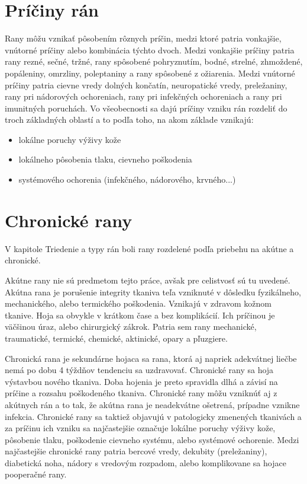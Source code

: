 \section{Príčiny rán}
Rany môžu vznikať pôsobením rôznych príčin, medzi ktoré patria vonkajšie, vnútorné príčiny alebo kombinácia týchto dvoch. Medzi vonkajšie príčiny patria rany rezné, sečné, tržné, rany spôsobené pohryznutím, bodné, strelné, zhmoždené, popáleniny, omrzliny, poleptaniny a rany spôsobené z ožiarenia. Medzi vnútorné príčiny patria cievne vredy dolných končatín, neuropatické vredy, preležaniny, rany pri nádorových ochoreniach, rany pri infekčných ochoreniach a rany pri imunitných poruchách. Vo všeobecnosti sa dajú príčiny vzniku rán rozdeliť do troch základných oblastí a to podľa toho, na akom základe vznikajú:
\begin{itemize} 
\item lokálne poruchy výživy kože
\item lokálneho pôsobenia tlaku, cievneho poškodenia
\item systémového ochorenia (infekčného, nádorového, krvného...)
\end{itemize}

\section{Chronické rany}
V kapitole Triedenie a typy rán boli rany rozdelené podľa priebehu na akútne a chronické. 

Akútne rany nie sú predmetom tejto práce, avšak pre celistvosť sú tu uvedené. Akútna rana je porušenie integrity tkaniva teľa vzniknuté v dôsledku fyzikálneho, mechanického, alebo termického poškodenia. Vznikajú v zdravom kožnom tkanive. Hoja sa obvykle v krátkom čase a bez komplikácií. Ich príčinou je väčšinou úraz, alebo chirurgický zákrok. Patria sem rany mechanické, traumatické, termické, chemické, aktinické, opary a pľuzgiere.

Chronická rana je sekundárne hojaca sa rana, ktorá aj napriek adekvátnej liečbe nemá po dobu 4 týždňov tendenciu sa uzdravovať. Chronické rany sa hoja výstavbou nového tkaniva. Doba hojenia je preto spravidla dlhá a závisí na príčine a rozsahu poškodeného tkaniva. Chronické rany môžu vzniknúť aj z akútnych rán a to tak, že akútna rana je neadekvátne ošetrená, prípadne vznikne infekcia. Chronické rany sa taktiež objavujú v patologicky zmenených tkanivách a za príčinu ich vzniku sa najčastejšie označuje lokálne poruchy výživy kože, pôsobenie tlaku, poškodenie cievneho systému, alebo systémové ochorenie. Medzi najčastejšie chronické rany patria bercové vredy, dekubity (preležaniny), diabetická noha, nádory s vredovým rozpadom, alebo komplikovane sa hojace pooperačné rany.

